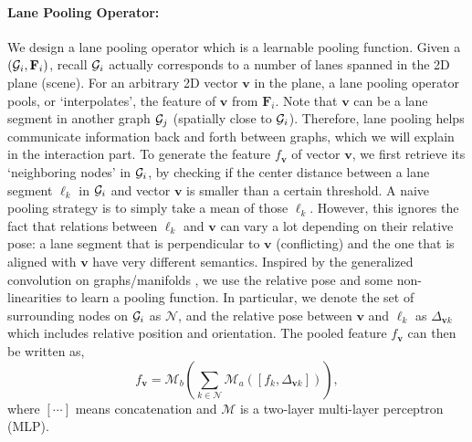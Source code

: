 \paragraph{Lane Pooling Operator:}
We design a lane pooling operator which is a learnable pooling function. Given a \ROI
$(\mathcal{G}_i, \mathbf{F}_i)$, recall $\mathcal{G}_i$ actually corresponds to a number of
lanes spanned in the 2D plane (scene). For an arbitrary 2D vector
$\mathbf{v}$ in the plane, a lane pooling operator pools, or `interpolates',
the feature of $\mathbf{v}$ from $\mathbf{F}_i$. Note that
$\mathbf{v}$ can be a lane segment in another graph $\mathcal{G}_j$ (spatially
close to $\mathcal{G}_i$). Therefore, lane pooling helps
communicate information back and forth between graphs, which we will explain in the interaction part.
To generate the feature $f_\mathbf{v}$ of vector $\mathbf{v}$, we first retrieve
its `neighboring nodes' in $\mathcal{G}_i$, by checking if the center distance between a lane segment
$\ell_k$ in $\mathcal{G}_i$ and vector $\mathbf{v}$ is smaller than a certain threshold. A naive
pooling strategy is to simply take a mean of those $\ell_k$. However, this
ignores the fact that relations between $\ell_k$ and $\mathbf{v}$ can vary a lot
depending on their relative pose: a lane segment that is perpendicular to
$\mathbf{v}$ (conflicting) and the one that is aligned with $\mathbf{v}$
have very different semantics. Inspired by the generalized convolution on graphs/manifolds
\cite{monti2017geometric, contconv, lgn}, we use the relative pose and some non-linearities to
learn a pooling function. In particular, we denote the set of surrounding
nodes on $\mathcal{G}_i$ as $\mathcal{N}$, and the relative pose between $\mathbf{v}$ and
$\ell_k$ as $\Delta_{\mathbf{v}k}$ which includes relative position and
orientation. The pooled feature $f_{\mathbf{v}}$ can then be written as,
\begin{equation}
  \label{eq:pool}
  f_{\mathbf{v}} = \mathcal{M}_b\left(\sum_{k\in \mathcal{N}}
    \mathcal{M}_a\left(\left[
        f_k, \Delta_{\mathbf{v}k}
\right]\right)\right),
\end{equation}
where $[\cdots]$ means concatenation and $\mathcal{M}$
is a two-layer multi-layer perceptron (MLP).








